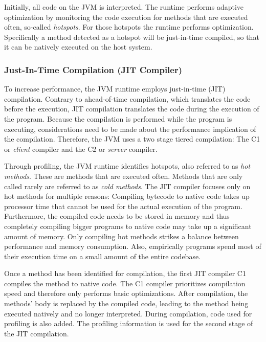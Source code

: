 Initially, all code on the JVM is interpreted. The runtime performs adaptive optimization by monitoring the code execution for methods that are executed often, so-called \textit{hotspots}. For those hotspots the runtime performs optimization. Specifically a method detected as a hotspot will be just-in-time compiled, so that it can be natively executed on the host system. 

\subsubsection{Just-In-Time Compilation (JIT Compiler)}

To increase performance, the JVM runtime employs just-in-time (JIT) compilation. Contrary to ahead-of-time compilation, which translates the code before the execution, JIT compilation translates the code during the execution of the program. Because the compilation is performed while the program is executing, considerations need to be made about the performance implication of the compilation. Therefore, the JVM uses a two stage tiered compilation: The C1 or \textit{client} compiler and the C2 or \textit{server} compiler.


Through profiling, the JVM runtime identifies hotspots, also referred to as \textit{hot methods}. These are methods that are executed often. Methods that are only called rarely are referred to as \textit{cold methods}. The JIT compiler focuses only on hot methods for multiple reasons: Compiling bytecode to native code takes up processor time that cannot be used for the actual execution of the program. Furthermore, the compiled code needs to be stored in memory and thus completely compiling bigger programs to native code may take up a significant amount of memory. Only compiling hot methods strikes a balance between performance and memory consumption. Also, empirically programs spend most of their execution time on a small amount of the entire codebase. 

Once a method has been identified for compilation, the first JIT compiler C1 compiles the method to native code. The C1 compiler prioritizes compilation speed and therefore only performs basic optimizations. After compilation, the methods' body is replaced by the compiled code, leading to the method being executed natively and no longer interpreted. During compilation, code used for profiling is also added. The profiling information is used for the second stage of the JIT compilation. 


